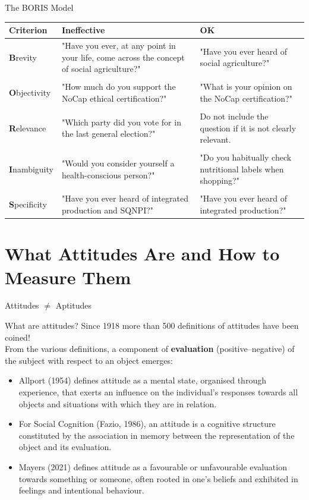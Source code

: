 \documentclass{beamer}
\begin{document}
\begin{frame}{The BORIS Model}
  \scriptsize
  \centering
  \begin{tabular}{lp{4cm}p{3.5cm}}
    \toprule
    \textbf{Criterion} & \textbf{Ineffective} & \textbf{OK} \\
    \midrule
    \textbf{B}revity & "Have you ever, at any point in your life, come across the concept of social agriculture?" & "Have you ever heard of social agriculture?" \\
    \\
    \textbf{O}bjectivity & "How much do you support the NoCap ethical certification?" & "What is your opinion on the NoCap certification?" \\
    \\
    \textbf{R}elevance & "Which party did you vote for in the last general election?" & Do not include the question if it is not clearly relevant. \\
    \\
    \textbf{I}nambiguity & "Would you consider yourself a health-conscious person?" & "Do you habitually check nutritional labels when shopping?" \\
    \\
    \textbf{S}pecificity & "Have you ever heard of integrated production and SQNPI?" & "Have you ever heard of integrated production?" \\
    \bottomrule
  \end{tabular}
\end{frame}

\section{What Attitudes Are and How to Measure Them}
\begin{frame}{Attitudes $\neq$ Aptitudes}
    \begin{block}{What are attitudes?}
        Since 1918 more than 500 definitions of attitudes have been coined! \\
        From the various definitions, a component of \textbf{evaluation} (positive–negative) of the subject with respect to an object emerges: \\
        \pause
        \small
    \begin{itemize}
        \item Allport (1954) defines attitude as a mental state, organised through experience, that exerts an influence on the individual's responses towards all objects and situations with which they are in relation.
        \item For Social Cognition (Fazio, 1986), an attitude is a cognitive structure constituted by the association in memory between the representation of the object and its evaluation.
        \item Mayers (2021) defines attitude as a favourable or unfavourable evaluation towards something or someone, often rooted in one's beliefs and exhibited in feelings and intentional behaviour.
    \end{itemize}
    \end{block}
\end{frame}
\end{document}
